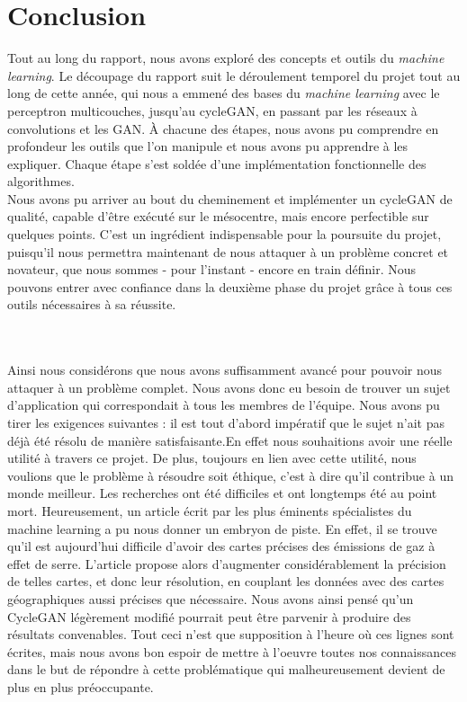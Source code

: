 \chapter*{Conclusion}


Tout au long du rapport, nous avons exploré des concepts et outils du \textit{machine learning}. Le découpage du rapport suit le déroulement temporel du projet tout au long de cette année, qui nous a emmené des bases du \textit{machine learning} avec le perceptron multicouches, jusqu’au cycleGAN, en passant par les réseaux à convolutions et les GAN. À chacune des étapes, nous avons pu comprendre en profondeur les outils que l'on manipule et nous avons pu apprendre à les expliquer. Chaque étape s'est soldée d'une implémentation fonctionnelle des algorithmes.\\
Nous avons pu arriver au bout du cheminement et implémenter un cycleGAN de qualité, capable d'être exécuté sur le mésocentre, mais encore perfectible sur quelques points. C'est un ingrédient indispensable pour la poursuite du projet, puisqu’il nous permettra maintenant de nous attaquer à un problème concret et novateur, que nous sommes - pour l'instant - encore en train définir. Nous pouvons entrer avec confiance dans la deuxième phase du projet grâce à tous ces outils nécessaires à sa réussite.

\\
\\
Ainsi nous considérons que nous avons suffisamment avancé pour pouvoir nous attaquer à un problème complet. Nous avons donc eu besoin de trouver un sujet d'application qui correspondait à tous les membres de l'équipe. Nous avons pu tirer les exigences suivantes : il est tout d'abord impératif que le sujet n'ait pas déjà été résolu de manière satisfaisante.En effet nous souhaitions avoir une réelle utilité à travers ce projet. De plus, toujours en lien avec cette utilité, nous voulions que le problème à résoudre soit éthique, c'est à dire qu'il contribue à un monde meilleur. Les recherches ont été difficiles et ont longtemps été au point mort. Heureusement, un article écrit par les plus éminents spécialistes du machine learning \cite{rolnick_tackling_2019-1} a pu nous donner un embryon de piste. En effet, il se trouve qu'il est aujourd'hui difficile d'avoir des cartes précises des émissions de gaz à effet de serre. L'article propose alors d'augmenter considérablement la précision de telles cartes, et donc leur résolution, en couplant les données avec des cartes géographiques aussi précises que nécessaire. Nous avons ainsi pensé qu'un CycleGAN légèrement modifié pourrait peut être parvenir à produire des résultats convenables. Tout ceci n'est que supposition à l'heure où ces lignes sont écrites, mais nous avons bon espoir de mettre à l'oeuvre toutes nos connaissances dans le but de répondre à cette problématique qui malheureusement devient de plus en plus préoccupante.   